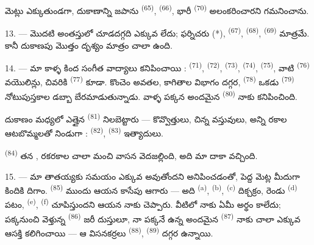 మెట్లు ఎక్కుతుండగా, దుకాణాన్ని జపాను  \textsuperscript{(65)},
 \textsuperscript{(66)}, భారీ  \textsuperscript{(70)}
అలంకరించారని గమనించాను.

13. --- మొదటి అంతస్తులో చూడదగ్గది ఎక్కువ లేదు; ఫర్నిచరు (*), 
\textsuperscript{(67)},  \textsuperscript{(68)},
 \textsuperscript{(69)} మాత్రమే. కానీ దుకాణపు మొత్తం దృశ్యం మాత్రం
చాలా  ఉంది.

14. --- మా కాళ్ళ కింద సంగీత వాద్యాలు కనిపించాయి : 
\textsuperscript{(71)},  \textsuperscript{(72)},
 \textsuperscript{(73)}, 
\textsuperscript{(74)},  \textsuperscript{(75)}, వాటి
 \textsuperscript{(76)} వయొలిన్లు, చివరికి 
\textsuperscript{(77)} కూడా. కొంచెం అవతల, కాగితాల విభాగం దగ్గర, 
\textsuperscript{(78)} ఒకడు  \textsuperscript{(79)} నోటుపుస్తకాల డబ్బా
బేరమాడుతున్నాడు. వాళ్ళ పక్కన అందమైన  \textsuperscript{(80)}
నాకు కనిపించింది.

దుకాణం మధ్యలో ఎత్తైన  \textsuperscript{(81)} నిలబెట్టారు —
కొవ్వొత్తులు, చిన్న వస్తువులు, అన్ని రకాల ఆటబొమ్మలతో నిండుగా : 
\textsuperscript{(82)},  \textsuperscript{(83)} ఇత్యాదులు.

 \textsuperscript{(84)} తన ,
రకరకాల  చాలా మంచి వాసన వెదజల్లింది, అది మా దాకా వచ్చింది.

\VUsaut{3.4mm}
\VUsaut{2.8mm}

15. --- మా తాతయ్యకు సమయం ఎక్కువ అవుతోందని అనిపించడంతో, పెద్ద మెట్ల మీదుగా కిందికి దిగాం.
 \textsuperscript{(85)} ముందు ఆయన కాసేపు ఆగారు — అది
 \textsuperscript{(a)}, 
\textsuperscript{(b)},  \textsuperscript{(c)}
 దిక్చక్రం, రెండు 
\textsuperscript{(d)} పటం,  \textsuperscript{(e)},
 \textsuperscript{(f)} చూపిస్తుందని ఆయన నాకు చెప్పారు. వీటిలో నాకు
ఏమీ అర్థం కాలేదు; పక్కనుంచి వెళ్తున్న 
\textsuperscript{(86)} జరీ దుస్తులూ, నా పక్కనే ఉన్న అందమైన 
\textsuperscript{(87)} నాకు చాలా ఎక్కువ ఆసక్తి కలిగించాయి — ఆ విసనకర్రలు
 \textsuperscript{(88)},  \textsuperscript{(89)}
దగ్గర ఉన్నాయి.

